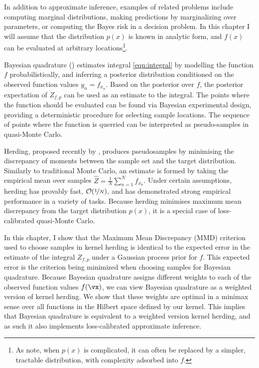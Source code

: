 In addition to approximate inference, examples of related problems include computing marginal distributions, making predictions by marginalizing over parameters, or computing the Bayes risk in a decision problem. In this chapter I will assume that the distribution $p(x)$ is known in analytic form, and $f(x)$ can be evaluated at arbitrary locations\footnote{As \citet{BZMonteCarlo} note, when $p(x)$ is complicated, it can often be replaced by a simpler, tractable distribution, with complexity adsorbed into $f$.}.

Bayesian quadrature (\bq{}) estimates integral \eqref{eqn:integral} by modelling the function $f$ probabilistically, and inferring a posterior distribution conditioned on the observed function values $y_n = f_{x_n}$. Based on the posterior over $f$, the posterior expectation of $Z_{f,p}$ can be used as an estimate to the integral. The points where the function should be evaluated can be found via Bayesian experimental design, providing a deterministic procedure for selecting sample locations. The sequence of points where the function is querried can be interpreted as pseudo-samples in quasi-Monte Carlo.

Herding, proposed recently by \cite{chen2010super}, produces pseudosamples by minimising the discrepancy of moments between the sample set and the target distribution. Similarly to traditional Monte Carlo, an estimate is formed by taking the empirical mean over samples $\hat{Z} = \frac{1}{N}\sum_{n=1}^{N}f_{x_n}$. Under certain assumptions, herding has provably fast, $\mathcal{O}(\nicefrac{1}{N})$, and has demonstrated strong empirical performance in a variety of tasks. Because herding minimises maximum mean discrepancy from the target distribution $p(x)$, it is a special case of loss-calibrated quasi-Monte Carlo.

In this chapter, I show that the Maximum Mean Discrepancy (MMD) criterion used to choose samples in kernel herding is identical to the expected error in the estimate of the integral $Z_{f,p}$ under a Gaussian process prior for $f$. This expected error is the criterion being minimized when choosing samples for Bayesian quadrature. Because Bayesian quadrature assigns different weights to each of the observed function values $f(\vx)$, we can view Bayesian quadrature as a weighted version of kernel herding. We show that these weights are optimal in a minimax sense over all functions in the Hilbert space defined by our kernel. This implies that Bayesian quadrature is equivalent to a weighted version kernel herding, and as such it also implements loss-calibrated approximate inference.

